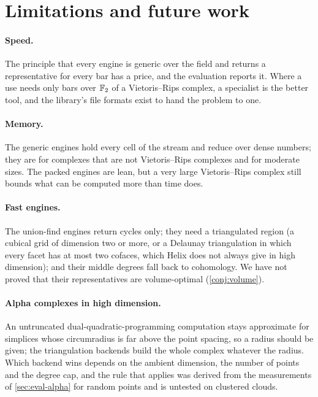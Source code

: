 \section{Limitations and future work}\label{sec:limitations}

\paragraph{Speed.}
The principle that every engine is generic over the field and returns a representative for every bar has a price,
and the evaluation reports it. Where a use needs only bars over $\mathbb{F}_2$ of a Vietoris--Rips complex, a specialist is the better
tool, and the library's file formats exist to hand the problem to one.

\paragraph{Memory.}
The generic engines hold every cell of the stream and reduce over dense numbers; they are for complexes that are not Vietoris--Rips
complexes and for moderate sizes. The packed engines are lean, but a very large Vietoris--Rips complex still bounds what can be
computed more than time does.

\paragraph{Fast engines.}
The union-find engines return cycles only; they need a triangulated region (a cubical grid of dimension two or more, or a
Delaunay triangulation in which every facet has at most two cofaces, which Helix does not always give in high dimension); and their
middle degrees fall back to cohomology. We have not proved that their representatives are volume-optimal (\cref{conj:volume}).

\paragraph{Alpha complexes in high dimension.}
An untruncated dual-quadratic-programming computation stays approximate for simplices whose circumradius is far above the point
spacing, so a radius should be given; the triangulation backends build the whole complex whatever the radius. Which backend
wins depends on the ambient dimension, the number of points and the degree cap, and the rule that  applies was
derived from the measurements of \cref{sec:eval-alpha} for random points and is untested on clustered clouds.

